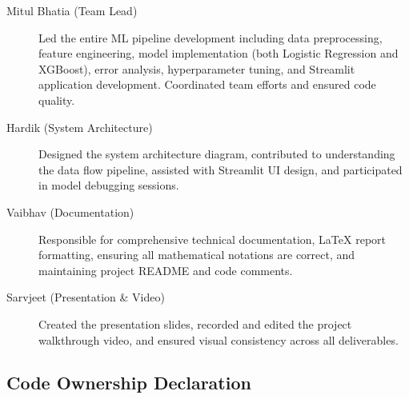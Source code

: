 \documentclass[12pt,a4paper]{article}
\begin{document}
\begin{description}
    \item[Mitul Bhatia (Team Lead)] Led the entire ML pipeline development including data preprocessing, feature engineering, model implementation (both Logistic Regression and XGBoost), error analysis, hyperparameter tuning, and Streamlit application development. Coordinated team efforts and ensured code quality.
    
    \item[Hardik (System Architecture)] Designed the system architecture diagram, contributed to understanding the data flow pipeline, assisted with Streamlit UI design, and participated in model debugging sessions.
    
    \item[Vaibhav (Documentation)] Responsible for comprehensive technical documentation, LaTeX report formatting, ensuring all mathematical notations are correct, and maintaining project README and code comments.
    
    \item[Sarvjeet (Presentation \& Video)] Created the presentation slides, recorded and edited the project walkthrough video, and ensured visual consistency across all deliverables.
\end{description}

\subsection{Code Ownership Declaration}

\begin{center}
\end{center}
\end{document}
